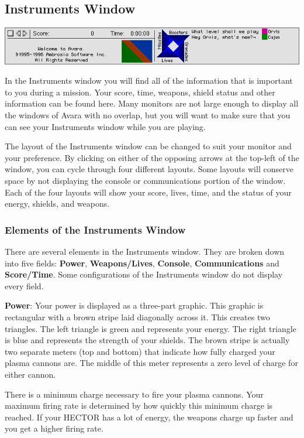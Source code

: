 \documentclass{article}
\begin{document}
\subsection{Instruments Window}
\begin{center}
	\includegraphics[width=\textwidth]{img/07.png}
\end{center}

In the Instruments window you will find all of the information that is important to you during a mission. Your score, time, weapons, shield status and other information can be found here. Many monitors are not large enough to display all the windows of Avara with no overlap, but you will want to make sure that you can see your Instruments window while you are playing.

The layout of the Instruments window can be changed to suit your monitor and your preference. By clicking on either of the opposing arrows at the top-left of the window, you can cycle through four different layouts. Some layouts will conserve space by not displaying the console or communications portion of the window. Each of the four layouts will show your score, lives, time, and the status of your energy, shields, and weapons.

\subsubsection{Elements of the Instruments Window}
There are several elements in the Instruments window. They are broken down into five fields: \textbf{Power}, \textbf{Weapons/Lives}, \textbf{Console}, \textbf{Communications} and \textbf{Score/Time}. Some configurations of the Instruments window do not display every field.

\textbf{Power}: Your power is displayed as a three-part graphic. This graphic is rectangular with a brown stripe laid diagonally across it. This creates two triangles. The left triangle is green and represents your energy. The right triangle is blue and represents the strength of your shields. The brown stripe is actually two separate meters (top and bottom) that indicate how fully charged your plasma cannons are. The middle of this meter represents a zero level of charge for either cannon.

There is a minimum charge necessary to fire your plasma cannons. Your maximum firing rate is determined by how quickly this minimum charge is reached. If your HECTOR has a lot of energy, the weapons charge up faster and you get a higher firing rate.
\end{document}
